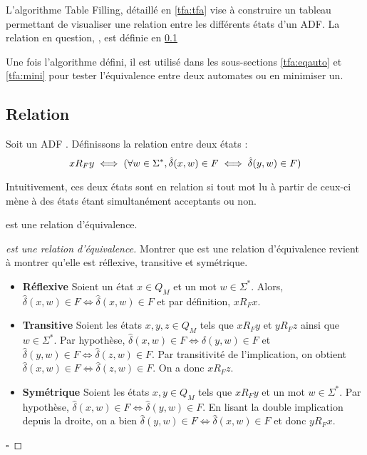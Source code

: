 L'algorithme Table Filling, détaillé en \ref{tfa:tfa} vise à construire un tableau permettant de visualiser une relation entre les différents états d'un ADF. La relation en question, \rf, est définie en \ref{tfa:re}

Une fois l'algorithme défini, il est utilisé dans les sous-sections \ref{tfa:eqauto} et \ref{tfa:mini} pour tester l'équivalence entre deux automates ou en minimiser un.





\subsection{Relation \rf}\label{tfa:re}

Soit un ADF \automaton. Définissons la relation \rf entre deux états :
$$xR_Fy \iff (\forall w \in \Sigma^*,\hat{\delta}(x,w) \in F \iff \hat{\delta}(y,w) \in F)$$

Intuitivement, ces deux états sont en relation si tout mot lu à partir de ceux-ci mène à des états étant simultanément acceptants ou non.

\begin{proposition}[\rf]
 \rf est une relation d'équivalence.
\end{proposition}

\begin{proof}[\rf est une relation d'équivalence] Montrer que \rf est une relation d'équivalence revient à montrer qu'elle est réflexive, transitive et symétrique.
 \begin{itemize}
	 \item \textbf{Réflexive} Soient un état $x \in Q_M$ et un mot $w \in \Sigma^*$. Alors, $\hat{\delta}(x,w) \in F \iff \hat{\delta}(x,w) \in F$ et par définition, $xR_Fx$.
	 \item \textbf{Transitive} Soient les états $x,y,z \in Q_M$ tels que $xR_Fy$ et $yR_Fz$ ainsi que $w \in \Sigma^*$. Par hypothèse, $\hat{\delta}(x,w) \in F \iff \hat{\delta}(y,w)\in F$ et $\hat{\delta}(y,w) \in F\iff \hat{\delta}(z,w) \in F$. Par transitivité de l'implication, on obtient $\hat{\delta}(x,w) \in F \iff \hat{\delta}(z,w)\in F$. On a donc $xR_Fz$.
	 \item \textbf{Symétrique} Soient les états $x,y \in Q_M$ tels que $xR_Fy$ et un mot $w \in \Sigma^*$. Par hypothèse, $\hat{\delta}(x, w)\in F \iff \hat{\delta}(y, w)\in F$. En lisant la double implication depuis la droite, on a bien $\hat{\delta}(y, w) \in F\iff \hat{\delta}(x, w)\in F$ et donc $yR_Fx$.
 \end{itemize}
 \hfill$\square$
\end{proof}

